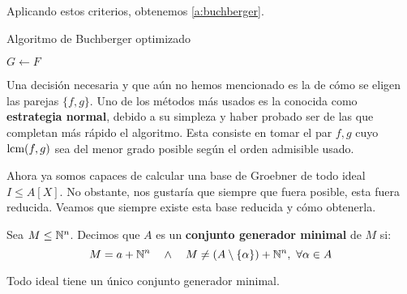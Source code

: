  Aplicando estos criterios, obtenemos \autoref{a:buchberger}.
 
\begin{algorithm}[hbt!]
    \caption{Algoritmo de Buchberger optimizado}\label{a:buchberger}

    $G\gets F$\;


\end{algorithm}

\begin{observacion}
    Una decisión necesaria y que aún no hemos mencionado es la de cómo se eligen las parejas $\{f,g\}$. Uno de los métodos más usados es la conocida como \textbf{estrategia normal}, debido a su simpleza y haber probado ser de las que completan más rápido el algoritmo. Esta consiste en tomar el par $f,g$ cuyo $\text{lcm}(f,g)$ sea del menor grado posible según el orden admisible usado.
\end{observacion}

Ahora ya somos capaces de calcular una base de Groebner de todo ideal $I\le A[X]$. No obstante, nos gustaría que siempre que fuera posible, esta fuera reducida. Veamos que siempre existe esta base reducida y cómo obtenerla.

\begin{definicion}
    Sea $M\le \mathbb{N}^n$. Decimos que $A$ es un \textbf{conjunto generador minimal} de $M$ si:
    \begin{equation*}
        M = a + \mathbb{N}^n \quad \wedge \quad M\neq (A\setminus \{\alpha\}) + \mathbb{N}^n,\ \forall \alpha \in A 
    \end{equation*}
\end{definicion}

\begin{lema}\label{l:minimal}
    Todo ideal tiene un único conjunto generador minimal.
\end{lema}

